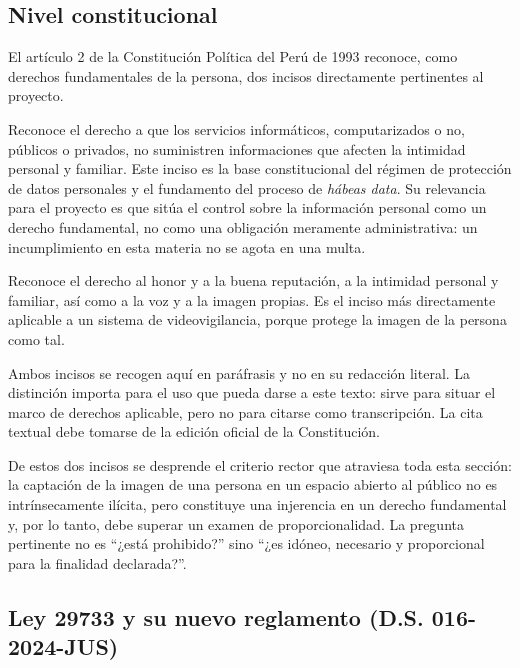 \subsection{Nivel constitucional}
\label{sec:constitucional}

El artículo 2 de la Constitución Política del Perú de 1993 reconoce, como
derechos fundamentales de la persona, dos incisos directamente
pertinentes al proyecto.

\begin{description}[leftmargin=0pt,labelindent=0pt,style=unboxed,itemsep=0.5em]
  \item[Inciso 6 --- autodeterminación informativa.] Reconoce el derecho
    a que los servicios informáticos, computarizados o no, públicos o
    privados, no suministren informaciones que afecten la intimidad
    personal y familiar. Este inciso es la base constitucional del
    régimen de protección de datos personales y el fundamento del proceso
    de \emph{hábeas data}. Su relevancia para el proyecto es que sitúa el
    control sobre la información personal como un derecho fundamental, no
    como una obligación meramente administrativa: un incumplimiento en
    esta materia no se agota en una multa.
  \item[Inciso 7 --- honor, intimidad, voz e imagen propias.] Reconoce el
    derecho al honor y a la buena reputación, a la intimidad personal y
    familiar, así como a la voz y a la imagen propias. Es el inciso más
    directamente aplicable a un sistema de videovigilancia, porque
    protege la imagen de la persona como tal.
\end{description}

Ambos incisos se recogen aquí en paráfrasis y no en su redacción literal.
La distinción importa para el uso que pueda darse a este texto: sirve
para situar el marco de derechos aplicable, pero no para citarse como
transcripción. La cita textual debe tomarse de la edición oficial de la
Constitución.

De estos dos incisos se desprende el criterio rector que atraviesa toda
esta sección: la captación de la imagen de una persona en un espacio
abierto al público no es intrínsecamente ilícita, pero constituye una
injerencia en un derecho fundamental y, por lo tanto, debe superar un
examen de proporcionalidad. La pregunta pertinente no es
\enquote{¿está prohibido?} sino \enquote{¿es idóneo, necesario y
proporcional para la finalidad declarada?}.

\subsection{Ley 29733 y su nuevo reglamento (D.S. 016-2024-JUS)}
\label{sec:ley29733}


